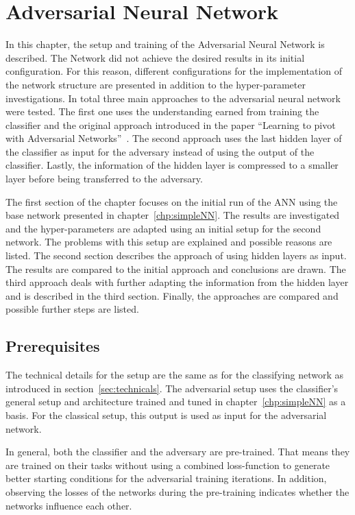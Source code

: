 \chapter{Adversarial Neural Network}
\label{chp:ANN}

In this chapter, the setup and training of the Adversarial Neural Network is described. The Network did not achieve the desired results in its initial configuration.
For this reason, different configurations for the implementation of the network structure are presented in addition to the hyper-parameter investigations.
In total three main approaches to the adversarial neural network were tested. The first one uses the understanding earned from training the classifier and the original approach introduced in the paper \enquote{Learning to pivot with Adversarial Networks}~\cite{Louppe:2016ylz}. The second approach uses the last hidden layer of the classifier as input for the adversary instead of using the output of the classifier. Lastly, the information of the hidden layer is compressed to a smaller layer before being transferred to the adversary.

The first section of the chapter focuses on the initial run of the ANN using the base network presented in chapter~\ref{chp:simpleNN}. The results are investigated and the hyper-parameters are adapted using an initial setup for the second network. The problems with this setup are explained and possible reasons are listed.
The second section describes the approach of using hidden layers as input. The results are compared to the initial approach and conclusions are drawn.
The third approach deals with further adapting the information from the hidden layer and is described in the third section.
Finally, the approaches are compared and possible further steps are listed.

\section*{Prerequisites}

The technical details for the setup are the same as for the classifying network as introduced in section~\ref{sec:technicals}.
The adversarial setup uses the classifier's general setup and architecture trained and tuned in chapter~\ref{chp:simpleNN} as a basis. For the classical setup, this output is used as input for the adversarial network.

In general, both the classifier and the adversary are pre-trained. That means they are trained on their tasks without using a combined loss-function to generate better starting conditions for the adversarial training iterations.
In addition, observing the losses of the networks during the pre-training indicates whether the networks influence each other.

